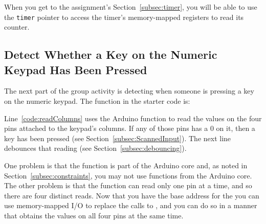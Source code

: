 When you get to the assignment's Section~\ref{subsec:timer}, you will be able to use the \lstinline{timer} pointer to access the timer's memory-mapped registers to read its counter.


\subsection{Detect Whether a Key on the Numeric Keypad Has Been Pressed} \label{subsec:detectKeyAction}

The next part of the group activity is detecting when someone is pressing a key on the numeric keypad.
The  function in the starter code is:



Line~\ref{code:readColumns} uses the Arduino function  to read the values on the four pins attached to the keypad's columns.
If any of those pins has a 0 on it, then a key has been pressed (see Section~\ref{subsec:ScannedInput}).
The next line debounces that reading (see Section~\ref{subsec:debouncing}).


One problem is that the  function is part of the Arduino core and, as noted in Section~\ref{subsec:constraints}, you may not use functions from the Arduino core.
The other problem is that the  function can read only one pin at a time, and so there are four distinct reads.
Now that you have the base address for the
you can use memory-mapped I/O to replace the calls to ,
and you can do so in a manner that obtains the values on all four pins at the same time.

